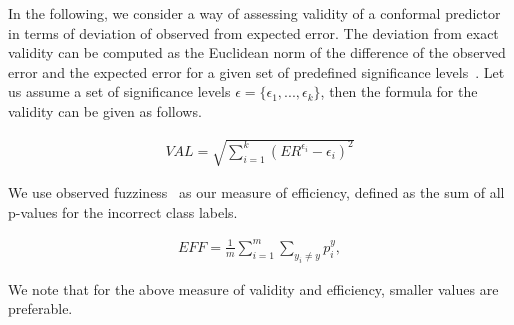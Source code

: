 \documentclass[main]{subfiles}
\begin{document}
In the following, we consider a way of assessing validity of a conformal predictor in terms of deviation of observed from expected error. The deviation from exact validity can be computed as the Euclidean norm of the difference of the observed error and the expected error for a given set of predefined significance levels~\citep{carlsson2017comparing}. Let us assume a set of significance levels $\epsilon = \{ \epsilon_1, ..., \epsilon_k \}$, then the formula for the validity can be given as follows.

\begin{definition}[Validity]
\begin{align} \label{eq:validity}
		VAL = \sqrt{ \sum\limits_{i=1}^{k} (ER^{\epsilon_i} -\epsilon_i)^2 }
\end{align}	 
\end{definition}


We use observed fuzziness~\citep{vovk2016criteria} as our measure of efficiency,  defined as the sum of all p-values for the incorrect class labels. %
\begin{definition}[Efficiency]
\begin{align} \label{eq:efficiency}
	EFF =\frac{ 1}{m} \sum\limits_{i=1}^{m} \sum\limits_{y_i \neq y }  p_i^y,		
\end{align}
\end{definition}
We note that for the above measure of validity and efficiency, smaller
values are preferable.
\end{document}
